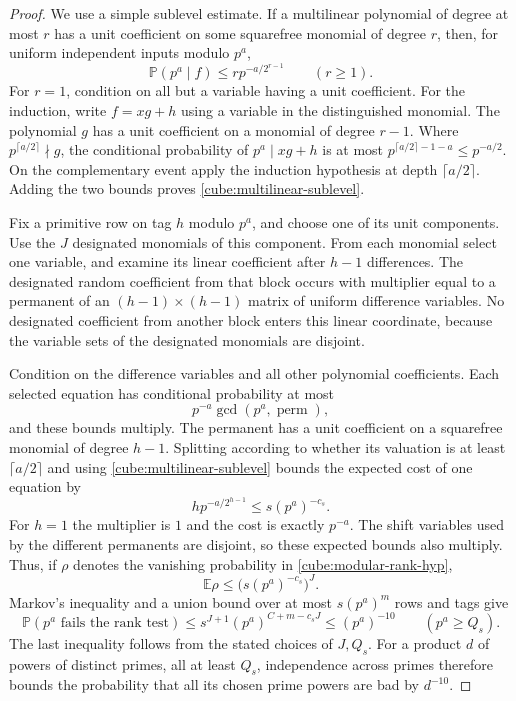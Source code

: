 \begin{proof}
We use a simple sublevel estimate.  If a multilinear polynomial of
degree at most $r$ has a unit coefficient on some squarefree monomial of
degree $r$, then, for uniform independent inputs modulo $p^a$,
\begin{equation}\label{cube:multilinear-sublevel}
 \mathbb P(p^a\mid f)\leq r p^{-a/2^{r-1}}\qquad(r\geq1).
\end{equation}
For $r=1$, condition on all but a variable having a unit coefficient.
For the induction, write $f=xg+h$ using a variable in the distinguished
monomial.  The polynomial $g$ has a unit coefficient on a monomial of
degree $r-1$.  Where $p^{\lceil a/2\rceil}\nmid g$, the conditional
probability of $p^a\mid xg+h$ is at most
$p^{\lceil a/2\rceil-1-a}\leq p^{-a/2}$.  On the complementary event
apply the induction hypothesis at depth $\lceil a/2\rceil$.  Adding the
two bounds proves \eqref{cube:multilinear-sublevel}.

Fix a primitive row on tag $h$ modulo $p^a$, and choose one of its unit
components.  Use the $J$ designated monomials of this component.  From
each monomial select one variable, and examine its linear coefficient
after $h-1$ differences.  The designated random coefficient from that
block occurs with multiplier equal to a permanent of an
$(h-1)\times(h-1)$ matrix of uniform difference variables.  No designated
coefficient from another block enters this linear coordinate, because
the variable sets of the designated monomials are disjoint.

Condition on the difference variables and all other polynomial
coefficients.  Each selected equation has conditional probability at
most
\[
 p^{-a}\gcd(p^a,\operatorname{perm}),
\]
and these bounds multiply.  The permanent has a unit coefficient on a
squarefree monomial of degree $h-1$.  Splitting according to whether its
valuation is at least $\lceil a/2\rceil$ and using
\eqref{cube:multilinear-sublevel} bounds the expected cost of one equation
by
\[
 h p^{-a/2^{h-1}}\leq s(p^a)^{-c_s}.
\]
For $h=1$ the multiplier is $1$ and the cost is exactly $p^{-a}$.
The shift variables used by the different permanents are disjoint, so
these expected bounds also multiply.  Thus, if $\rho$ denotes the
vanishing probability in \eqref{cube:modular-rank-hyp},
\[
 \mathbb E\rho\leq\bigl(s(p^a)^{-c_s}\bigr)^J.
\]
Markov's inequality and a union bound over at most $s(p^a)^m$ rows and
tags give
\[
 \mathbb P(p^a\text{ fails the rank test})
 \leq s^{J+1}(p^a)^{C+m-c_sJ}
 \leq(p^a)^{-10}\qquad(p^a\geq Q_s).
\]
The last inequality follows from the stated choices of $J,Q_s$.
For a product $d$ of powers of distinct primes, all at least $Q_s$,
independence across primes therefore bounds the probability that all its
chosen prime powers are bad by $d^{-10}$.


\end{proof}
